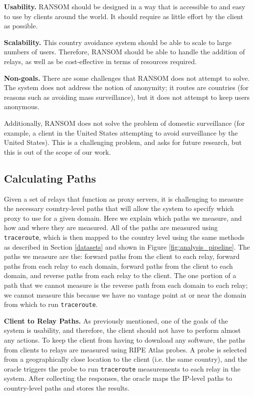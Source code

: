 {\bf Usability.} RANSOM should be designed in a way that is accessible to and 
easy to use by clients around the world.  It should require as little effort by 
the client as possible.

{\bf Scalability.}  This country avoidance system should be able to scale to 
large numbers of users.  Therefore, RANSOM should be able to handle the addition
 of relays, as well as be cost-effective in terms of resources required.

{\bf Non-goals.}  There are some challenges that RANSOM does not attempt to 
solve.  The system does not address the notion of anonymity; it routes are 
countries (for reasons such as avoiding mass surveillance), but it does not 
attempt to keep users anonymous.  

Additionally, RANSOM does not solve the problem of domestic surveillance (for 
example, a client in the United States attempting to avoid surveillance by the 
United States).  This is a challenging problem, and asks for future research, 
but this is out of the scope of our work.

\subsection{Calculating Paths}
Given a set of relays that function as proxy servers, it is challenging to 
measure the necessary country-level paths that will allow the system to specify 
which proxy to use for a given domain.  Here we explain which paths we measure, 
and how and where they are measured.  All of the paths are measured using {\tt 
traceroute}, which is then mapped to the country level using the same methods as 
described in Section \ref{datasets} and shown in Figure 
\ref{fig:analysis_pipeline}.  The paths we measure are the: forward paths from 
the client to each relay, forward paths from each relay to each domain, forward 
paths from the client to each domain, and reverse paths from each relay to the 
client.  The one portion of a path that we cannot measure is the reverse path 
from each domain to each relay; we cannot measure this because we have no 
vantage point at or near the domain from which to run {\tt traceroute}.

{\bf Client to Relay Paths.} As previously mentioned, one of the goals of the 
system is usability, and therefore, the client should not have to perform 
almost any actions.  To keep the client from having to download any software, 
the paths from clients to relays are measured using RIPE Atlas probes.  A probe 
is selected from a geographically close location to the client (i.e. the same 
country), and the oracle triggers the probe to run {\tt traceroute} measurements 
to each relay in the system.  After collecting the responses, the oracle maps 
the IP-level paths to country-level paths and stores the results.

